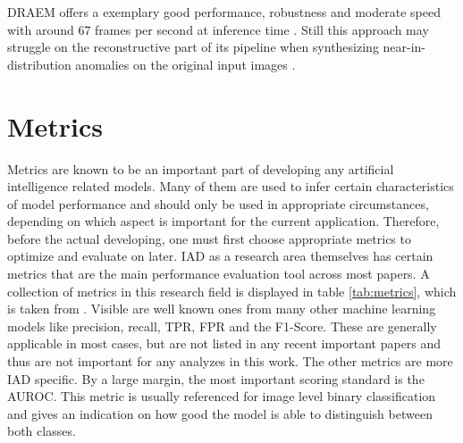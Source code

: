 DRAEM offers a exemplary good performance, robustness and moderate speed with around 67 frames per second at inference time \cite{liu2023simplenet}. Still this approach may struggle on the reconstructive 
part of its pipeline when synthesizing near-in-distribution anomalies on the original input images \cite{liu2024deep}. %










\section{Metrics}
\label{sec:metrics}
Metrics are known to be an important part of developing any artificial intelligence related models. Many of them are used to infer 
certain characteristics of model performance and should only be used in appropriate circumstances, depending on which aspect 
is important for the current application. Therefore, before the actual developing, one must first choose appropriate metrics 
to optimize and evaluate on later. IAD as a research area themselves has certain metrics that are the main performance evaluation tool 
across most papers.\newline 
A collection of metrics in this research field is displayed in table \ref{tab:metrics}, which is taken from 
\cite{liu2024deep}. Visible are well known 
ones from many other machine learning models like precision, recall, TPR, FPR and the F1-Score. These are generally applicable in most 
cases, but are not listed in any recent important papers and thus are not important for any analyzes in this work. The other metrics are 
more IAD specific. By a large margin, the most important scoring standard is the AUROC. This metric is usually referenced for image level 
binary classification and gives an indication on how good the model is able to distinguish between both classes. 



